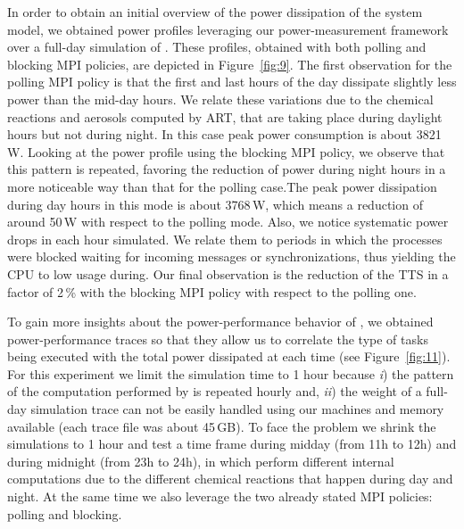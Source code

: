 
In order to obtain an initial overview of the power dissipation of the system model, we obtained power profiles leveraging our \pmlib power-measurement framework over a full-day simulation of \cosmoart. These profiles, obtained with both polling and blocking MPI policies, are depicted in  Figure~\ref{fig:9}. The first observation for the polling MPI policy is that the first and last hours of the day dissipate slightly less power than the mid-day hours. We relate these variations due to the chemical reactions and aerosols computed by ART, that are taking place during daylight hours but not during night. In this case peak power consumption is about 3821\,W. Looking at the power profile using the blocking MPI policy, we observe that this pattern is repeated, favoring the reduction of power during night hours in a more noticeable way than that for the polling case.The peak power dissipation during day hours in this mode is about 3768\,W, which means a reduction of around 50\,W with respect to the polling mode. Also, we notice systematic power drops in each hour simulated. We relate them to periods in which the processes were blocked waiting for incoming messages or synchronizations, thus yielding the CPU to low usage during. Our final observation is the reduction of the TTS in a factor of 2\,\% with the blocking MPI policy with respect to the polling one.

To gain more insights about the power-performance behavior of \cosmoart, we obtained power-per\-for\-man\-ce traces so that they allow us to correlate the type of tasks being executed with the total power dissipated at each time (see Figure~\ref{fig:11}). For this experiment we limit the simulation time to 1 hour because \emph{i}) the pattern of the computation performed by \cosmoart is repeated hourly and, \emph{ii}) the weight of a full-day simulation trace can not be easily handled using our machines and memory available (each trace file was about 45\,GB). To face the problem we shrink the simulations to 1 hour and test a time frame during midday (from 11h to 12h) and during midnight (from 23h to 24h), in which \cosmoart perform different internal computations due to the different chemical reactions that happen during day and night. At the same time we also leverage the two already stated MPI policies: polling and blocking. 

